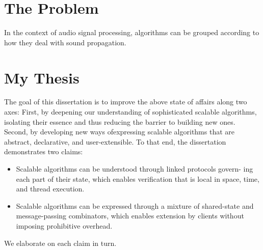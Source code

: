 

\lipsum[1]

\section{The Problem}\label{sec:intro:problem}
In the context of audio signal processing, algorithms can be grouped according to how they deal with sound propagation.

\section{My Thesis}
The goal of this dissertation is to improve the above state of affairs along two axes:
First, by deepening our understanding of sophisticated scalable algorithms, isolating their essence and thus reducing the barrier to building new ones. Second, by developing new ways ofexpressing scalable algorithms that are abstract, declarative, and user-extensible.
To that end, the dissertation demonstrates two claims:
\begin{itemize}
    \item
    Scalable algorithms can be understood through linked protocols govern- ing each part of their state, which enables verification that is local in space, time, and thread execution.
    \item
    Scalable algorithms can be expressed through a mixture of shared-state and message-passing combinators, which enables extension by clients without imposing prohibitive overhead.
\end{itemize}
We elaborate on each claim in turn.

